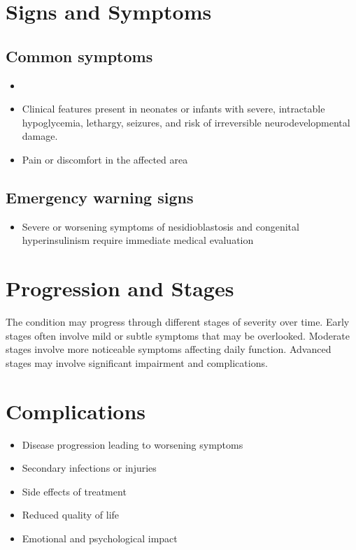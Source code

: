 \section{Signs and Symptoms}

\subsection{Common symptoms}
\begin{itemize}[noitemsep]
  \item \item Clinical features present in neonates or infants with severe, intractable hypoglycemia, lethargy, seizures, and risk of irreversible neurodevelopmental damage.

  \item Pain or discomfort in the affected area
  \end{itemize}

\subsection{Emergency warning signs}
\begin{itemize}[noitemsep]
  \item Severe or worsening symptoms of nesidioblastosis and congenital hyperinsulinism require immediate medical evaluation
\end{itemize}
\section{Progression and Stages}
The condition may progress through different stages of severity over time. Early stages often involve mild or subtle symptoms that may be overlooked. Moderate stages involve more noticeable symptoms affecting daily function. Advanced stages may involve significant impairment and complications.
\section{Complications}
\begin{itemize}[noitemsep]
  \item Disease progression leading to worsening symptoms
  \item Secondary infections or injuries
  \item Side effects of treatment
  \item Reduced quality of life
  \item Emotional and psychological impact
\end{itemize}
